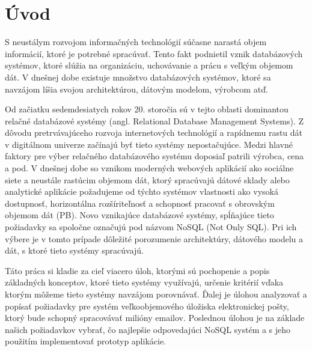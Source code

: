 \documentclass[11pt,twoside,a4paper]{book}
\begin{document}

% 
% 

\chapter{Úvod}
S neustálym rozvojom informačných technológií súčasne narastá objem informácií, ktoré je potrebné spracúvať. Tento fakt podnietil vznik databázových systémov, ktoré slúžia na organizáciu, uchovávanie a prácu s veľkým objemom dát. V dnešnej dobe existuje množstvo databázových systémov, ktoré sa navzájom líšia svojou architektúrou, dátovým modelom, výrobcom atď.

Od začiatku sedemdesiatych rokov 20. storočia sú v tejto oblasti dominantou relačné databázové systémy (angl. Relational Database Management Systems). Z dôvodu pretrvávajúceho rozvoja internetových technológií a rapídnemu rastu dát v digitálnom univerze \cite{Gantz_Mcarthur_Minton_2007} začínajú byť tieto systémy nepostačujúce. Medzi hlavné faktory pre výber relačného databázového systému doposiaľ patrili výrobca, cena a pod. V dnešnej dobe so vznikom moderných webových aplikácií ako sociálne siete a neustále rastúcim objemom dát, ktorý spracúvajú dátové sklady alebo analytické aplikácie požadujeme od týchto systémov vlastnosti ako vysoká dostupnosť, horizontálna rozšíriteľnosť a schopnosť pracovať s obrovským objemom dát (PB). Novo vznikajúce databázové systémy, spĺňajúce tieto požiadavky sa spoločne označujú pod názvom NoSQL (Not Only SQL). Pri ich výbere je v tomto prípade dôležité porozumenie architektúry, dátového modelu a dát, s ktoré tieto systémy spracúvajú.

Táto práca si kladie za cieľ viacero úloh, ktorými sú pochopenie a popis základných  konceptov, ktoré tieto systémy využívajú, určenie kritérií vďaka ktorým môžeme tieto systémy navzájom porovnávať. Ďalej je úlohou analyzovať a popísať požiadavky pre systém veľkoobjemového úložiska elektronickej pošty, ktorý bude schopný spracovávať milióny emailov. Poslednou úlohou je na základe našich požiadavkov vybrať, čo najlepšie odpovedajúci NoSQL systém a s jeho použitím implementovať prototyp aplikácie.
\end{document}

